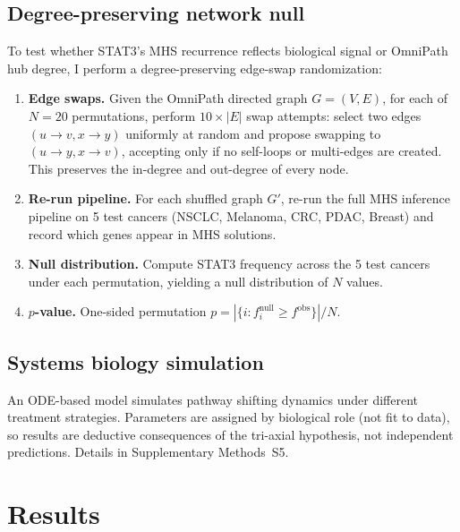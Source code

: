 \documentclass[times, twoside, watermark]{zHenriquesLab-StyleBioRxiv}
\begin{document}
\subsection*{Degree-preserving network null}
To test whether STAT3's MHS recurrence reflects biological signal or OmniPath hub degree, I perform a degree-preserving edge-swap randomization:
\begin{enumerate}
\item \textbf{Edge swaps.} Given the OmniPath directed graph $G = (V, E)$, for each of $N = 20$ permutations, perform $10 \times |E|$ swap attempts: select two edges $(u \to v, x \to y)$ uniformly at random and propose swapping to $(u \to y, x \to v)$, accepting only if no self-loops or multi-edges are created. This preserves the in-degree and out-degree of every node.
\item \textbf{Re-run pipeline.} For each shuffled graph $G'$, re-run the full MHS inference pipeline on 5 test cancers (NSCLC, Melanoma, CRC, PDAC, Breast) and record which genes appear in MHS solutions.
\item \textbf{Null distribution.} Compute STAT3 frequency across the 5 test cancers under each permutation, yielding a null distribution of $N$ values.
\item \textbf{$p$-value.} One-sided permutation $p = |\{i : f_i^{\text{null}} \geq f^{\text{obs}}\}| / N$.
\end{enumerate}

\subsection*{Systems biology simulation}
An ODE-based model simulates pathway shifting dynamics under different treatment strategies. Parameters are assigned by biological role (not fit to data), so results are deductive consequences of the tri-axial hypothesis, not independent predictions. Details in Supplementary Methods~S5.

\section*{Results}
\end{document}
